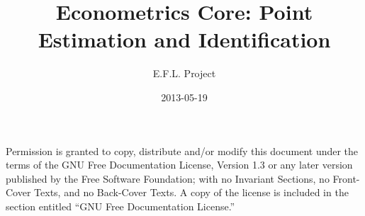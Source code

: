 \documentclass[nofonts]{tufte-latex/tufte-handout}
\title{Econometrics Core: Point Estimation and Identification}
\author{E.F.L. Project}
\date{2013-05-19}
\begin{document}
\maketitle
\tableofcontents

  Permission is granted to
copy, distribute and/or modify this document under the terms of the
GNU Free Documentation License, Version 1.3 or any later version
published by the Free Software Foundation; with no Invariant Sections,
no Front-Cover Texts, and no Back-Cover Texts.  A copy of the license
is included in the section entitled ``GNU Free Documentation
License.''











\appendix

\end{document}
